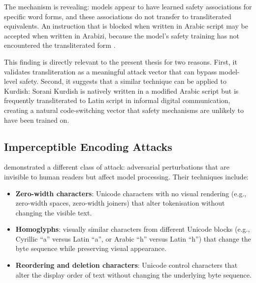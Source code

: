 \begin{justify}
The mechanism is revealing: models appear to have learned safety associations for specific word forms, and these associations do not transfer to transliterated equivalents.  An instruction that is blocked when written in Arabic script may be accepted when written in Arabizi, because the model's safety training has not encountered the transliterated form \citep{alghanim2024jailbreaking}.
\end{justify}

\begin{justify}
This finding is directly relevant to the present thesis for two reasons.  First, it validates transliteration as a meaningful attack vector that can bypass model-level safety.  Second, it suggests that a similar technique can be applied to Kurdish: Sorani Kurdish is natively written in a modified Arabic script but is frequently transliterated to Latin script in informal digital communication, creating a natural code-switching vector that safety mechanisms are unlikely to have been trained on.
\end{justify}

\subsection{Imperceptible Encoding Attacks}

\begin{justify}
\cite{boucher2022bad} demonstrated a different class of attack: adversarial perturbations that are invisible to human readers but affect model processing.  Their techniques include:
\end{justify}

\begin{itemize}
  \item \textbf{Zero-width characters}: Unicode characters with no visual rendering (e.g., zero-width spaces, zero-width joiners) that alter tokenisation without changing the visible text.
  \item \textbf{Homoglyphs}: visually similar characters from different Unicode blocks (e.g., Cyrillic ``a'' versus Latin ``a'', or Arabic ``h'' versus Latin ``h'') that change the byte sequence while preserving visual appearance.
  \item \textbf{Reordering and deletion characters}: Unicode control characters that alter the display order of text without changing the underlying byte sequence.
\end{itemize}

